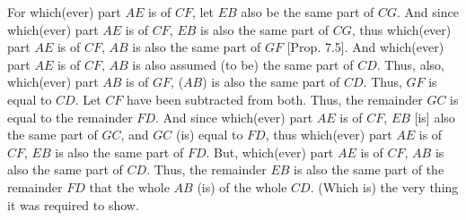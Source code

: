 \begin{Parallel}{}{}
{For which(ever) part $AE$ is of $CF$, let $EB$ also be the same part of $CG$.
And since which(ever) part $AE$ is of $CF$, $EB$ is also the same part
of $CG$, thus which(ever) part $AE$ is of $CF$, $AB$ is also the same part of
$GF$ [Prop. 7.5]. And which(ever) part $AE$ is of $CF$, $AB$ is also assumed (to be)
the same part of $CD$. Thus, also, which(ever) part $AB$ is of $GF$, ($AB$) is also
the same part of $CD$. Thus, $GF$ is equal to $CD$. Let $CF$ have been subtracted from
both. Thus, the remainder $GC$ is equal to the remainder $FD$. And since
which(ever) part $AE$ is of $CF$, $EB$ [is] also the same part of $GC$, and $GC$ (is)
equal to $FD$, thus which(ever) part $AE$ is of $CF$, $EB$ is also the same part of
$FD$.
 But, 
which(ever) part $AE$ is of $CF$, $AB$ is also the same part of $CD$. Thus, the
remainder $EB$ is also the same part of the remainder $FD$ that
the whole $AB$ (is) of the whole $CD$. (Which is) the very thing it
was required to show.}
\end{Parallel}


\vspace{7pt}{\footnotesize \noindent$^\dag$ In modern notation, this
proposition states that if $a=(1/n)\,b$ and $c=(1/n)\,d$ then $(a-c)=
(1/n)\,(b-d)$, where all symbols denote numbers.}

